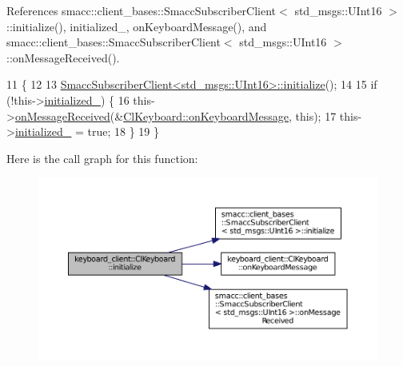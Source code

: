 References smacc\+::client\+\_\+bases\+::\+Smacc\+Subscriber\+Client$<$ std\+\_\+msgs\+::\+U\+Int16 $>$\+::initialize(), initialized\+\_\+, on\+Keyboard\+Message(), and smacc\+::client\+\_\+bases\+::\+Smacc\+Subscriber\+Client$<$ std\+\_\+msgs\+::\+U\+Int16 $>$\+::on\+Message\+Received().


\begin{DoxyCode}
11                             \{
12 
13   \hyperlink{classsmacc_1_1client__bases_1_1SmaccSubscriberClient_af188f0f5e89de26a07e1f964cdd23a70}{SmaccSubscriberClient<std\_msgs::UInt16>::initialize}();
14 
15   \textcolor{keywordflow}{if} (!this->\hyperlink{classkeyboard__client_1_1ClKeyboard_aff74d4f212f4846a1f7cc6c0e4d5f728}{initialized\_}) \{
16     this->\hyperlink{classsmacc_1_1client__bases_1_1SmaccSubscriberClient_a4f02251e3a161fb6d802b154b1081f18}{onMessageReceived}(&\hyperlink{classkeyboard__client_1_1ClKeyboard_adbfb9c2b98f784b12cf7740b4e861d8e}{ClKeyboard::onKeyboardMessage}, \textcolor{keyword}{
      this});
17     this->\hyperlink{classkeyboard__client_1_1ClKeyboard_aff74d4f212f4846a1f7cc6c0e4d5f728}{initialized\_} = \textcolor{keyword}{true};
18   \}
19 \}
\end{DoxyCode}


Here is the call graph for this function\+:
\nopagebreak
\begin{figure}[H]
\begin{center}
\leavevmode
\includegraphics[width=350pt]{classkeyboard__client_1_1ClKeyboard_a7ac4502969c62b0c836b531cec05f8ed_cgraph}
\end{center}
\end{figure}


